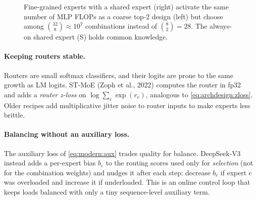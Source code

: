 \begin{figure}[t]
\centering
{}
\caption{Fine-grained experts with a shared expert (right) activate the same number of MLP FLOPs as a
coarse top-2 design (left) but choose among $\binom{32}{8}\approx10^7$ combinations instead of
$\binom{8}{2}=28$. The always-on shared expert (S) holds common knowledge.}
\label{fig:attnalt:moe}
\end{figure}

\paragraph{Keeping routers stable.} Routers are small softmax classifiers, and their logits are prone to the
same growth as LM logits. ST-MoE (Zoph et al., 2022) computes the router in fp32 and adds a \emph{router
z-loss} on $\log\sum_e\exp(r_e)$, analogous to \cref{eq:archdesign:zloss}. Older recipes add multiplicative
jitter noise to router inputs to make experts less brittle.

\paragraph{Balancing without an auxiliary loss.} The auxiliary loss of \cref{eq:modern:aux} trades
quality for balance. DeepSeek-V3 instead adds a per-expert bias $b_e$ to the routing scores used only for
\emph{selection} (not for the combination weights) and nudges it after each step: decrease $b_e$ if expert
$e$ was overloaded and increase it if underloaded. This is an online control loop that keeps loads balanced
with only a tiny sequence-level auxiliary term.

